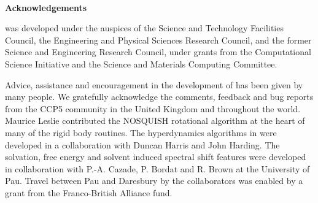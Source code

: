 ~

\vspace{1.5 in}
\centerline{{\bf \D{} Acknowledgements}}
\vspace{1 in}
\D{} was developed under the auspices of the 
Science and Technology Facilities Council, the Engineering and
Physical Sciences Research Council, and the former Science and
Engineering Research Council, under grants from the Computational
Science Initiative and the Science and Materials Computing Committee.

\vspace{.25 in} Advice, assistance and encouragement in the development of \D{}
has been given by many people. We gratefully acknowledge the comments,
feedback and bug reports from the CCP5 community in the United Kingdom and
throughout the world. Maurice Leslie contributed the NOSQUISH rotational
algorithm at the heart of many of the rigid body routines. The hyperdynamics
algorithms in \D{} were developed in a collaboration with Duncan Harris and John
Harding. The solvation, free energy and solvent induced spectral shift
features were developed in collaboration with P.-A. Cazade, P. Bordat and
R. Brown at the University of Pau. Travel between Pau and Daresbury by the
collaborators was enabled by a grant from the Franco-British Alliance fund.


\clearpage
